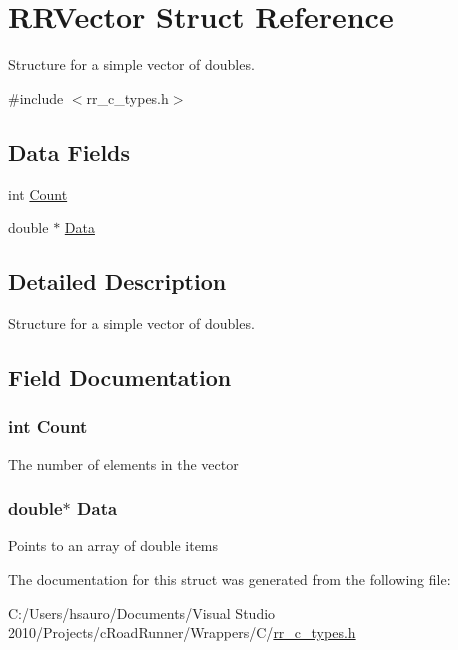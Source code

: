 \hypertarget{struct_r_r_vector}{
\section{\-R\-R\-Vector \-Struct \-Reference}
\label{struct_r_r_vector}
}


\-Structure for a simple vector of doubles.  




{\ttfamily \#include $<$rr\-\_\-c\-\_\-types.\-h$>$}

\subsection*{\-Data \-Fields}
\begin{DoxyCompactItemize}
\item 
int \hyperlink{struct_r_r_vector_aad462966ed963f892117056de1eba502}{\-Count}
\item 
double $\ast$ \hyperlink{struct_r_r_vector_a7c5cbda3aa940f4b0d6e8a1679307dfc}{\-Data}
\end{DoxyCompactItemize}


\subsection{\-Detailed \-Description}
\-Structure for a simple vector of doubles. 

\subsection{\-Field \-Documentation}
\hypertarget{struct_r_r_vector_aad462966ed963f892117056de1eba502}{
\subsubsection[{\-Count}]{\setlength{\rightskip}{0pt plus 5cm}int {\bf \-Count}}}
\label{struct_r_r_vector_aad462966ed963f892117056de1eba502}
\-The number of elements in the vector \hypertarget{struct_r_r_vector_a7c5cbda3aa940f4b0d6e8a1679307dfc}{
\subsubsection[{\-Data}]{\setlength{\rightskip}{0pt plus 5cm}double$\ast$ {\bf \-Data}}}
\label{struct_r_r_vector_a7c5cbda3aa940f4b0d6e8a1679307dfc}
\-Points to an array of double items 

\-The documentation for this struct was generated from the following file\-:\begin{DoxyCompactItemize}
\item 
\-C\-:/\-Users/hsauro/\-Documents/\-Visual Studio 2010/\-Projects/c\-Road\-Runner/\-Wrappers/\-C/\hyperlink{rr__c__types_8h}{rr\-\_\-c\-\_\-types.\-h}\end{DoxyCompactItemize}
